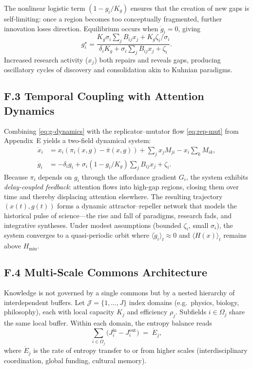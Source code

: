 \documentclass[11pt,a4paper,titlepage]{article}
\theoremstyle{definition}
\begin{document}
\begin{itemize}
The nonlinear logistic term $(1 - g_i/K_g)$ ensures that the creation of new gaps
is self-limiting: once a region becomes too conceptually fragmented,
further innovation loses direction.
Equilibrium occurs when $\dot g_i=0$, giving
\begin{equation}
g_i^\star = \frac{K_g \sigma_i \sum_j B_{ij}x_j + K_g \zeta_i/\sigma_i}{\delta_i K_g + \sigma_i\sum_j B_{ij}x_j + \zeta_i}.
\end{equation}
Increased research activity ($x_j$) both repairs and reveals gaps,
producing oscillatory cycles of discovery and consolidation
akin to Kuhnian paradigms.

\subsection*{F.3 Temporal Coupling with Attention Dynamics}

Combining \eqref{eq:g-dynamics} with the replicator--mutator flow
\eqref{eq:rep-mut} from Appendix~E yields a two-field dynamical system:
\begin{align}
\dot{x}_i &= x_i(\pi_i(x,g)-\bar\pi(x,g)) + \sum_j x_jM_{ji} - x_i\sum_k M_{ik}, \label{eq:xdyn}\\
\dot{g}_i &= -\delta_i g_i + \sigma_i(1-g_i/K_g)\sum_j B_{ij}x_j + \zeta_i. \label{eq:gdyn2}
\end{align}
Because $\pi_i$ depends on $g_i$ through the affordance gradient $G_i$,
the system exhibits \emph{delay-coupled feedback}:
attention flows into high-gap regions,
closing them over time and thereby displacing attention elsewhere.
The resulting trajectory $(x(t),g(t))$
forms a dynamic attractor--repeller network that models
the historical pulse of science---the rise and fall of paradigms,
research fads, and integrative syntheses.
Under modest assumptions (bounded $\zeta_i$, small $\sigma_i$),
the system converges to a quasi-periodic orbit
where $\langle \dot g_i\rangle_t \approx 0$
and $\langle H(x)\rangle_t$ remains above $H_{\min}$.

\subsection*{F.4 Multi-Scale Commons Architecture}

Knowledge is not governed by a single commons but by
a nested hierarchy of interdependent buffers.
Let $\mathcal{J}=\{1,\dots,J\}$ index domains (e.g.\ physics, biology, philosophy),
each with local capacity $K_j$ and efficiency $\rho_j$.
Subfields $i\in \Omega_j$ share the same local buffer.
Within each domain, the entropy balance reads
\begin{equation}
\sum_{i\in\Omega_j} \big(J^{\mathrm{in}}_i - J^{\mathrm{out}}_i\big)
\;=\;
\dot{E}_j,
\label{eq:local-balance}
\end{equation}
where $\dot{E}_j$ is the rate of entropy transfer to or from higher scales
(interdisciplinary coordination, global funding, cultural memory).


\end{itemize}
\end{document}
